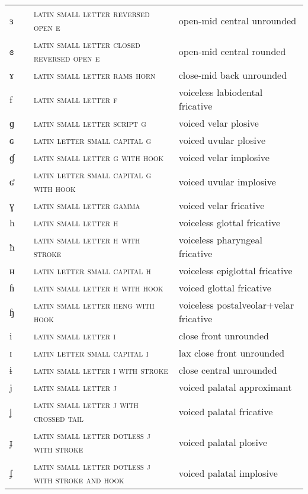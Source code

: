 \begin{center}
\begin{xtabular}{ l l L{4.5cm} L{4.5cm} }
ɜ &  & \textsc{latin small letter reversed open e} & open-mid central unrounded \\ 
ɞ &  & \textsc{latin small letter closed reversed open e} & open-mid central rounded \\ 
ɤ &  & \textsc{latin small letter rams horn} & close-mid back unrounded \\ 
f &  & \textsc{latin small letter f} & voiceless labiodental fricative \\ 
ɡ &  & \textsc{latin small letter script g} & voiced velar plosive \\ 
ɢ &  & \textsc{latin letter small capital g} & voiced uvular plosive \\ 
ɠ &  & \textsc{latin small letter g with hook} & voiced velar implosive \\ 
ʛ &  & \textsc{latin letter small capital g with hook} & voiced uvular implosive \\ 
ɣ &  & \textsc{latin small letter gamma} & voiced velar fricative \\ 
h &  & \textsc{latin small letter h} & voiceless glottal fricative \\ 
ħ &  & \textsc{latin small letter h with stroke} & voiceless pharyngeal fricative \\ 
ʜ &  & \textsc{latin letter small capital h} & voiceless epiglottal fricative \\ 
ɦ &  & \textsc{latin small letter h with hook} & voiced glottal fricative \\ 
ɧ &  & \textsc{latin small letter heng with hook} & voiceless postalveolar+velar fricative \\ 
i &  & \textsc{latin small letter i} & close front unrounded \\ 
ɪ &  & \textsc{latin letter small capital i} & lax close front unrounded \\ 
ɨ &  & \textsc{latin small letter i with stroke} & close central unrounded \\ 
j &  & \textsc{latin small letter j} & voiced palatal approximant \\ 
ʝ &  & \textsc{latin small letter j with crossed tail} & voiced palatal fricative \\ 
ɟ &  & \textsc{latin small letter dotless j with stroke} & voiced palatal plosive \\ 
ʄ &  & \textsc{latin small letter dotless j with stroke and hook} & voiced palatal implosive \\ 

\end{xtabular}
\end{center}
